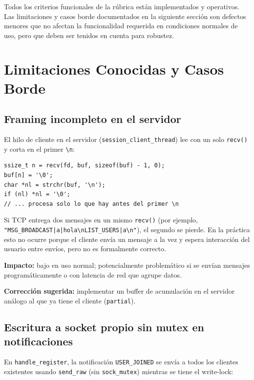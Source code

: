 \documentclass[12pt,a4paper]{article}
\begin{document}
Todos los criterios funcionales de la rúbrica están implementados y operativos.  Las
limitaciones y casos borde documentados en la siguiente sección son defectos menores
que no afectan la funcionalidad requerida en condiciones normales de uso, pero que
deben ser tenidos en cuenta para robustez.

\section{Limitaciones Conocidas y Casos Borde}
\label{sec:limitaciones}

\subsection{Framing incompleto en el servidor}
\label{sec:framing}

El hilo de cliente en el servidor (\texttt{session\_client\_thread}) lee con un solo
\texttt{recv()} y corta en el primer \texttt{\textbackslash n}:

\begin{lstlisting}[caption={Framing del servidor --- descarta datos después del primer \texttt{\textbackslash n}}]
ssize_t n = recv(fd, buf, sizeof(buf) - 1, 0);
buf[n] = '\0';
char *nl = strchr(buf, '\n');
if (nl) *nl = '\0';
// ... procesa solo lo que hay antes del primer \n
\end{lstlisting}

Si TCP entrega dos mensajes en un mismo \texttt{recv()} (por ejemplo,
\texttt{"MSG\_BROADCAST|a|hola\textbackslash nLIST\_USERS|a\textbackslash n"}),
el segundo se pierde.  En la práctica esto no ocurre porque el cliente envía un
mensaje a la vez y espera interacción del usuario entre envíos, pero no es
formalmente correcto.

\textbf{Impacto:} bajo en uso normal; potencialmente problemático si se envían
mensajes programáticamente o con latencia de red que agrupe datos.

\textbf{Corrección sugerida:} implementar un buffer de acumulación en el servidor
análogo al que ya tiene el cliente (\texttt{partial}).

\subsection{Escritura a socket propio sin mutex en notificaciones}

En \texttt{handle\_register}, la notificación \texttt{USER\_JOINED} se envía a todos
los clientes existentes usando \texttt{send\_raw} (sin \texttt{sock\_mutex}) mientras
se tiene el write-lock:
\end{document}
